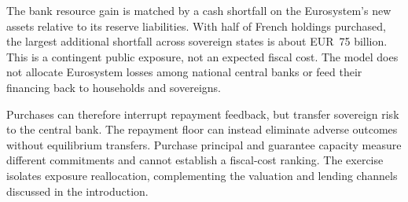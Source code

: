 The bank resource gain is matched by a cash shortfall on the Eurosystem's new assets relative to its reserve liabilities. With half of French holdings purchased, the largest additional shortfall across sovereign states is about EUR~75 billion. This is a contingent public exposure, not an expected fiscal cost. The model does not allocate Eurosystem losses among national central banks or feed their financing back to households and sovereigns.

Purchases can therefore interrupt repayment feedback, but transfer sovereign risk to the central bank. The repayment floor can instead eliminate adverse outcomes without equilibrium transfers. Purchase principal and guarantee capacity measure different commitments and cannot establish a fiscal-cost ranking. The exercise isolates exposure reallocation, complementing the valuation and lending channels discussed in the introduction.

